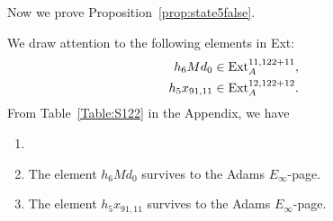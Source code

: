 Now we prove Proposition~\ref{prop:state5false}.

We draw attention to the following elements in Ext:
\begin{align*}
h_6 M d_0 & \in \mathrm{Ext}_A^{11,122+11}, \\
h_5x_{91,11} & \in \mathrm{Ext}_A^{12,122+12}.
\end{align*}
From Table~\ref{Table:S122} in the Appendix, we have
\begin{axiom} \label{fact:stem122}
\begin{enumerate}
    \item[]
    \item The element $h_6 M d_0$ survives to the Adams $E_\infty$-page.
    \item The element $h_5x_{91,11}$ survives to the Adams $E_\infty$-page.
\end{enumerate}

\end{axiom}

